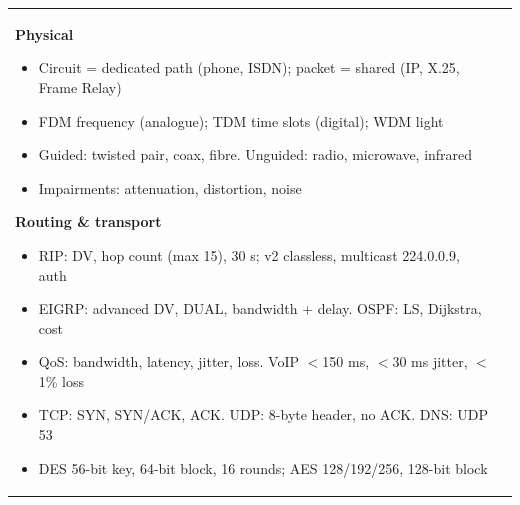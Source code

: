 \documentclass[10pt]{article}
\begin{document}
\begin{cheatsheet}
\begin{tabularx}{\linewidth}{@{}XX@{}}
\begin{itemize}
\end{itemize}
\textbf{Physical}
\begin{itemize}
\item Circuit = dedicated path (phone, ISDN); packet = shared (IP, X.25, Frame Relay)
\item FDM frequency (analogue); TDM time slots (digital); WDM light
\item Guided: twisted pair, coax, fibre. Unguided: radio, microwave, infrared
\item Impairments: attenuation, distortion, noise
\end{itemize}
\textbf{Routing \& transport}
\begin{itemize}
\item RIP: DV, hop count (max 15), 30 s; v2 classless, multicast 224.0.0.9, auth
\item EIGRP: advanced DV, DUAL, bandwidth + delay. OSPF: LS, Dijkstra, cost
\item QoS: bandwidth, latency, jitter, loss. VoIP $<$150 ms, $<$30 ms jitter, $<$1\% loss
\item TCP: SYN, SYN/ACK, ACK. UDP: 8-byte header, no ACK. DNS: UDP 53
\item DES 56-bit key, 64-bit block, 16 rounds; AES 128/192/256, 128-bit block
\end{itemize}
\end{tabularx}
\end{cheatsheet}
\end{document}

